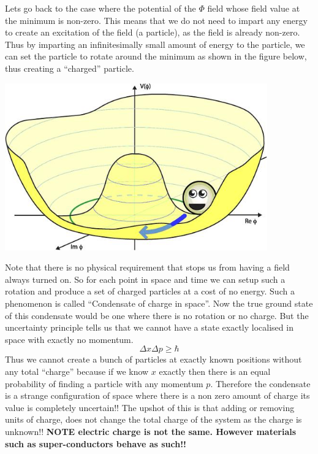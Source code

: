 Lets go back to the case where the potential of the $\Phi$ field whose field value at the minimum is non-zero. This means that we do not need to impart any energy to create an excitation of the field (a particle), as the field is already non-zero. Thus by imparting an infinitesimally small amount of energy to the particle, we can set the particle to rotate around the minimum as shown in the figure below, thus creating a ``charged'' particle. 
\begin{center}
\includegraphics[width=0.85\textwidth]{fig/higgs/phi_goldstone.JPG}
\end{center}
Note  that there is no physical requirement that stops us from having a field always turned on. So for each point in space and time we can setup such a rotation and produce a set of charged particles at a cost of no energy. Such a phenomenon is called ``Condensate of charge in space''. Now the true ground state of this condensate would be one where there is no rotation or no charge. But the uncertainty principle tells us that we cannot have a state exactly localised in space with exactly no momentum.
\[
\Delta x\Delta p\geq\hbar
\]
Thus we cannot create a bunch of particles at exactly known positions without any total ``charge'' because if we know $x$ exactly then there is an equal probability of finding a particle with any momentum $p$. Therefore the condensate is a strange configuration of space where there is a non zero amount of charge its value is completely uncertain!! The upshot of this is that adding or removing  units of charge, does not change the total charge of the system as the charge is unknown!!  {\bf NOTE electric charge is not the same. However materials such as super-conductors behave as such!!}

